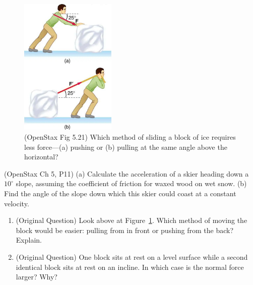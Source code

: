 \documentclass[10pt,twocolumn]{exam}
\def\answer#1{\footnotetext{#1}}
\def\myquestion{\question\stepcounter{footnote}}
\begin{document}
\begin{questions}
    \begin{figure}[ht]
      \centering
      \includegraphics[width=1.8in]{OpenStaxImages/5-21.jpg}
      \caption{(OpenStax Fig 5.21) Which method of sliding a block of ice requires less force—(a) pushing or (b) pulling at the same angle above the horizontal?}
      \label{5-21}
    \end{figure}

  


  \myquestion
    (OpenStax Ch 5, P11) (a) Calculate the acceleration of a skier heading down a $10^\circ$ slope, assuming the coefficient of friction for waxed wood on wet snow. (b) Find the angle of the slope down which this skier could coast at a constant velocity. \answer{$5.71^\circ$}
  
  \begin{enumerate}[resume*]
    \item (Original Question) Look above at Figure~\ref{5-21}.  Which method of moving the block would be easier: pulling from in front or pushing from the back? Explain.
    \item (Original Question) One block sits at rest on a level surface while a second identical block sits at rest on an incline.  In which case is the normal force larger?  Why?
  \end{enumerate}


\end{questions}
\end{document}
